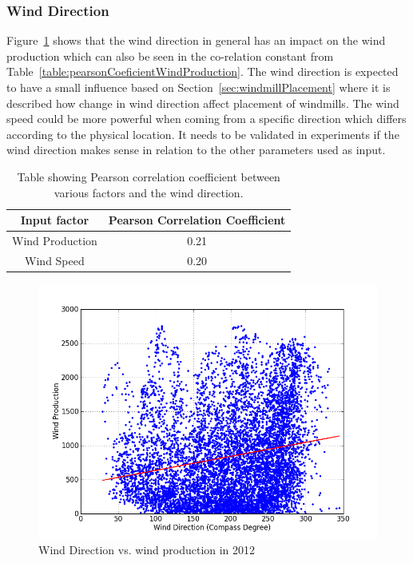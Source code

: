 \subsubsection{Wind Direction}
Figure~\ref{fig:windDirVsProd} shows that the wind direction in general has an impact on the wind production which can also be seen in the co-relation constant from Table~\ref{table:pearsonCoeficientWindProduction}. The wind direction is expected to have a small influence based on Section~\ref{sec:windmillPlacement} where it is described how change in wind direction affect placement of windmills. The wind speed could be more powerful when coming from a specific direction which differs according to the physical location. It needs to be validated in experiments if the wind direction makes sense in relation to the other parameters used as input.
 
\begin{table}[H]
\centering  %
\begin{tabular}{c c} %
Input factor & Pearson Correlation Coefficient \\ [0.5ex] %
\hline                  %
Wind Production & 0.21 \\ %
Wind Speed & 0.20 \\ [1ex] %
\hline %
\end{tabular}
\caption{Table showing Pearson correlation coefficient between various factors and the wind direction.} %
\label{table:pearsonCoeficientWindDirection} %
\end{table}

\begin{figure}[H]
\centering
\includegraphics[width=0.99\linewidth,natwidth=898,natheight=587]{billeder/productionVsWindDirection.png}
\caption{Wind Direction vs. wind production in 2012}
\label{fig:windDirVsProd}
\end{figure}


